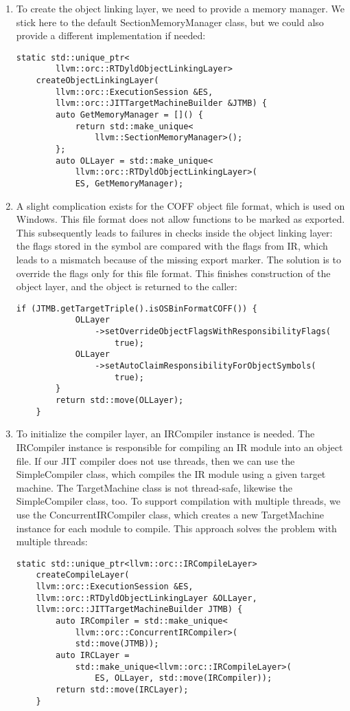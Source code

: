 \begin{enumerate}
\item To create the object linking layer, we need to provide a memory manager. We stick here to the default SectionMemoryManager class, but we could also provide a different implementation if needed:
\begin{lstlisting}[caption={}]
	static std::unique_ptr<
		llvm::orc::RTDyldObjectLinkingLayer>
	createObjectLinkingLayer(
		llvm::orc::ExecutionSession &ES,
		llvm::orc::JITTargetMachineBuilder &JTMB) {
		auto GetMemoryManager = []() {
			return std::make_unique<
				llvm::SectionMemoryManager>();
		};
		auto OLLayer = std::make_unique<
			llvm::orc::RTDyldObjectLinkingLayer>(
			ES, GetMemoryManager);
\end{lstlisting}

\item A slight complication exists for the COFF object file format, which is used on Windows. This file format does not allow functions to be marked as exported. This subsequently leads to failures in checks inside the object linking layer: the flags stored in the symbol are compared with the flags from IR, which leads to a mismatch because of the missing export marker. The solution is to override the flags only for this file format. This finishes construction of the object layer, and the object is returned to the caller:
\begin{lstlisting}[caption={}]
		if (JTMB.getTargetTriple().isOSBinFormatCOFF()) {
			OLLayer
				->setOverrideObjectFlagsWithResponsibilityFlags(
					true);
			OLLayer
				->setAutoClaimResponsibilityForObjectSymbols(
					true);
		}
		return std::move(OLLayer);
	}
\end{lstlisting}

\item To initialize the compiler layer, an IRCompiler instance is needed. The IRCompiler instance is responsible for compiling an IR module into an object file. If our JIT compiler does not use threads, then we can use the SimpleCompiler class, which compiles the IR module using a given target machine. The TargetMachine class is not thread-safe, likewise the SimpleCompiler class, too. To support compilation with multiple threads, we use the ConcurrentIRCompiler class, which creates a new TargetMachine instance for each module to compile. This approach solves the problem with multiple threads:
\begin{lstlisting}[caption={}]
	static std::unique_ptr<llvm::orc::IRCompileLayer>
	createCompileLayer(
	llvm::orc::ExecutionSession &ES,
	llvm::orc::RTDyldObjectLinkingLayer &OLLayer,
	llvm::orc::JITTargetMachineBuilder JTMB) {
		auto IRCompiler = std::make_unique<
			llvm::orc::ConcurrentIRCompiler>(
			std::move(JTMB));
		auto IRCLayer =
			std::make_unique<llvm::orc::IRCompileLayer>(
				ES, OLLayer, std::move(IRCompiler));
		return std::move(IRCLayer);
	}
\end{lstlisting}


\end{enumerate}
